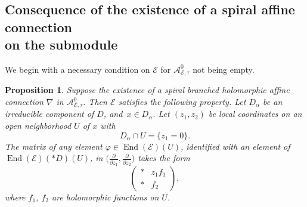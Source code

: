 \documentclass[pdftex]{sigma}
\newcommand{\der}[2]{\frac{\partial #1}{\partial#2}}
\numberwithin{equation}{section}
\newtheorem{Proposition}[Theorem]{Proposition}
 { \theoremstyle{definition}
\newtheorem{Definition}[Theorem]{Definition}
\newtheorem{Note}[Theorem]{Note}
\newtheorem{Exemple}[Theorem]{Example}
\newtheorem{Remark}[Theorem]{Remark} }
\begin{document}
\subsection[Consequence of the existence of a spiral affine connection on the submodule]{Consequence of the existence of a spiral affine connection\\ on the submodule}
We begin with a necessary condition on $\mathcal{E}$ for $\mathcal{A}^0_{\mathcal{E},\tau}$ not being empty.
\begin{Proposition}\label{necessarynottau} Suppose the existence of a spiral branched holomorphic affine connection $\nabla$ in $\mathcal{A}^0_{\mathcal{E},\tau}$. Then $\mathcal{E}$ satisfies the following property. Let $D_\alpha$ be an irreducible component of $D$, and~$x\in D_\alpha$. Let $(z_1,z_2)$ be local coordinates on an open neighborhood $U$ of $x$ with
\[D_\alpha \cap U=\{z_1=0\}.\]
The matrix of any element $\varphi \in \operatorname{End}(\mathcal{E})(U)$, identified with an element of $\operatorname{End}(\mathcal{E})(* D)(U)$, in $\big(\der{}{z_1},\der{}{z_2}\big)$ takes the form
\begin{equation}\label{formnottau} \begin{pmatrix} * & z_1 f_1 \\ * & f_2 \end{pmatrix}, \end{equation} where $f_1$, $f_2$ are holomorphic functions on $U$.\end{Proposition}
\end{document}
